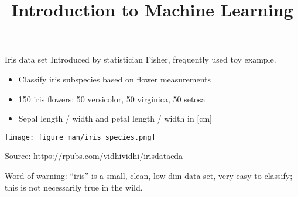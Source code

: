 \documentclass[11pt,compress,t,notes=noshow, xcolor=table]{beamer}
\title{Introduction to Machine Learning}
\begin{document}



\begin{vbframe}{Iris data set}
Introduced by statistician Fisher,  frequently used toy example.
\begin{itemize}
\item Classify iris subspecies based on flower measurements
\item 150 iris flowers: 50 versicolor, 50 virginica, 50 setosa
\item Sepal length / width and petal length / width in [cm]
\end{itemize}

\begin{center}
\texttt{[image: figure\_man/iris\_species.png]} 

\tiny
Source: \url{https://rpubs.com/vidhividhi/irisdataeda}
\normalsize
\end{center}

Word of warning: ``iris'' is a small, clean, low-dim data set,
 very easy to classify; this is not necessarily true in the wild. 

\end{vbframe}
\end{document}
